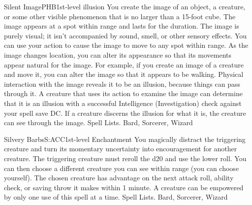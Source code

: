 \begin{spell}{Silent Image}{PHB}{1st-level illusion}
{
}
You create the image of an object, a creature, or some other visible phenomenon that is no larger than a 15-foot cube. The image appears at a spot within range and lasts for the duration. The image is purely visual; it isn’t accompanied by sound, smell, or other sensory effects.
You can use your action to cause the image to move to any spot within range. As the image changes location, you can alter its appearance so that its movements appear natural for the image. For example, if you create an image of a creature and move it, you can alter the image so that it appears to be walking.
Physical interaction with the image reveals it to be an illusion, because things can pass through it. A creature that uses its action to examine the image can determine that it is an illusion with a successful Intelligence (Investigation) check against your spell save DC. If a creature discerns the illusion for what it is, the creature can see through the image.
Spell Lists. Bard, Sorcerer, Wizard
\end{spell}

\begin{spell}{Silvery Barbs}{S:ACC}{1st-level Enchantment}
{
}
You magically distract the triggering creature and turn its momentary uncertainty into encouragement for another creature. The triggering creature must reroll the d20 and use the lower roll.
You can then choose a different creature you can see within range (you can choose yourself). The chosen creature has advantage on the next attack roll, ability check, or saving throw it makes within 1 minute. A creature can be empowered by only one use of this spell at a time.
Spell Lists. Bard, Sorcerer, Wizard
\end{spell}

